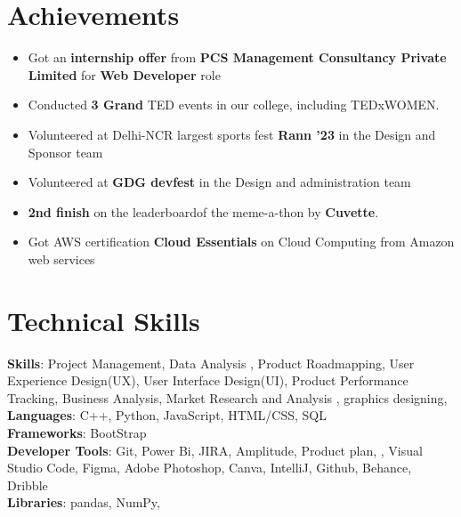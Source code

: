 \documentclass[a4paper,20pt]{article}
\newcommand{\resumeItem}[1]{
  \item\small{
    {#1 \vspace{-2pt}}
  }
}
\newcommand{\resumeItemListStart}{\begin{itemize}}
\newcommand{\resumeItemListEnd}{\end{itemize}\vspace{-5pt}}
\begin{document}
\section{Achievements}
 \begin{itemize}[leftmargin=0.15in, label={}]
    \resumeItemListStart
        \resumeItem{Got an \textbf{internship offer} from \textbf{PCS Management Consultancy Private Limited} for \textbf{Web Developer} role}
        \resumeItem{Conducted \textbf{3 Grand} TED events in our college, including TEDxWOMEN.}
        \resumeItem{Volunteered at Delhi-NCR largest sports fest \textbf{Rann '23} in the Design and Sponsor team} 
        \resumeItem{Volunteered at \textbf{GDG  devfest} in the Design and administration team} 
        \resumeItem{\textbf{2nd finish } on the leaderboardof the meme-a-thon by \textbf{Cuvette}.}
        \resumeItem{Got AWS certification \textbf{Cloud Essentials} on Cloud Computing from Amazon web services}
      \resumeItemListEnd
 \end{itemize}
 \vspace{-16pt}

%
\section{Technical Skills}
 \begin{itemize}[leftmargin=0.15in, label={}]
    \small{\item{
    \textbf{Skills}{: Project Management, Data Analysis
, Product Roadmapping, User Experience Design(UX), User Interface Design(UI), Product Performance Tracking, Business Analysis, Market Research and Analysis
, graphics designing, }\\
     \textbf{Languages}{: C++, Python, JavaScript, HTML/CSS, SQL} \\
     \textbf{Frameworks}{:  BootStrap  } \\
     \textbf{Developer Tools}{: Git, Power Bi, JIRA, Amplitude, Product plan, , Visual Studio Code, Figma, Adobe Photoshop, Canva, IntelliJ, Github, Behance, Dribble} \\
     \textbf{Libraries}{: pandas, NumPy, } \\
    }}
 \end{itemize}
 \vspace{-16pt}
\end{document}
